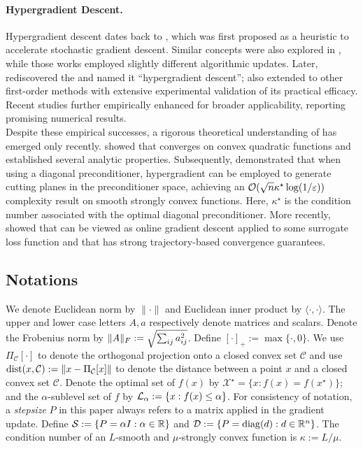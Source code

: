 \paragraph{Hypergradient Descent.}
Hypergradient descent dates back to \cite{almeida1999parameter}, which was first proposed as a heuristic to accelerate stochastic gradient descent. 
Similar concepts were also explored in \cite{sutton1992adapting,schraudolph1999local,jacobs1988increased,mahmood2012tuning}, while those works employed slightly different algorithmic updates. 
Later, \cite{gunes2018online} rediscovered the {\hdm} and named it ``hypergradient descent''; \cite{gunes2018online} also extended {\hdm} to other first-order methods with extensive experimental validation of its practical efficacy.  Recent studies \cite{jie2022adaptive,chandra2022gradient,ozkara2024mada} further empirically enhanced {\hdm} for broader applicability, reporting promising numerical results.\\

Despite these empirical successes, a rigorous theoretical understanding of {\hdm} has emerged only recently. \cite{rubio2017convergence} showed that {\hdm} converges on convex quadratic functions and established several analytic properties. 
Subsequently, \cite{kunstner2024searching} demonstrated that when using a diagonal preconditioner, hypergradient can be employed to generate cutting planes in the preconditioner space, achieving an $\mathcal{O}(\sqrt{n}\kappa^\star \log (1/\varepsilon))$ complexity result on smooth strongly convex functions. Here, $\kappa^\star$ is the condition number associated with the optimal diagonal preconditioner. 
More recently, \cite{gao2024gradient} showed that {\hdm} can be viewed as online gradient descent applied to some surrogate loss function and that {\hdm} has strong trajectory-based convergence guarantees.

\subsection{Notations}
We denote Euclidean norm by $\| \cdot \|$ and  Euclidean inner product by $\langle \cdot, \cdot \rangle$.
The upper and lower case letters $A, a$ respectively denote matrices and scalars. 
Denote the Frobenius norm by $\| A \|_F
:= \sqrt{\sum_{i j} a_{i j}^2}$. Define $[\cdot]_+ := \max\{\cdot, 0\}$. We use
$\Pi_{\mathcal{C}} [\cdot]$ to denote the orthogonal projection onto a
closed convex set $\mathcal{C}$ and use $\operatorname{dist}
(x, \mathcal{C}) := \| x - \Pi_{\mathcal{C}} [x] \|$ to denote the distance between a point $x$ and a closed convex set $\mathcal{C}$. 
Denote the optimal set of $f (x)$ by $\mathcal{X}^{\star} = \{ x : f (x) = f (x^{\star}) \}$; and the $\alpha$-sublevel set of $f$ by $\mathcal{L}_\alpha := \{x: f(x) \leq \alpha\}$. 
For consistency of notation, a \textit{stepsize} $P$ in this paper always refers to a matrix applied in the gradient update.
Define $\mathcal{S} := \{ P = \alpha I : \alpha \in
\mathbb{R} \}$ and $\mathcal{D} := \{ P = \operatorname{diag} (d) : d \in \mathbb{R}^n \}$. The condition number of an $L$-smooth and $\mu$-strongly convex function is $\kappa := L/\mu$.